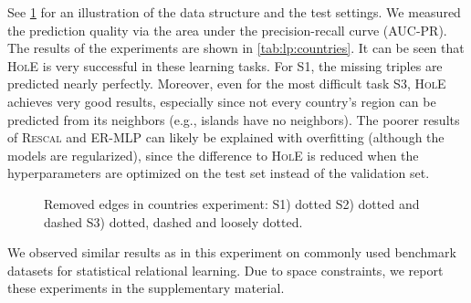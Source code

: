 \documentclass[letterpaper]{article}
\newcommand{\hole}{\textsc{HolE}\xspace}
\newcommand{\rescal}{\textsc{Rescal}\xspace}
\newcommand{\emlp}{\textsc{ER-MLP}\xspace}
\begin{document}
See \cref{fig:countries} for an illustration of the data structure and the test
settings. 
We measured the prediction quality via the area under the
precision-recall curve (AUC-PR).
The results of the experiments are shown in \cref{tab:lp:countries}. It
can be seen that \hole is very successful in these
learning tasks. For S1, the missing triples are predicted nearly
perfectly. Moreover, even for the most difficult task S3, \hole achieves very good
results, especially since not every country's region can be predicted from its
neighbors (e.g., islands have no neighbors). The poorer results of \rescal and
\emlp can likely be explained with overfitting (although the models are
regularized), since the difference to \hole is
reduced when the hyperparameters are optimized on the
test set instead of the validation set.
\begin{figure}[tb]
  \centering
  \vspace{-1ex}
  \hspace{1.5em}
  \caption{Removed edges in countries experiment: S1) dotted
    S2) dotted and dashed S3) dotted, dashed and loosely dotted.\label{fig:countries}}
\end{figure}
We observed similar results as in this experiment on commonly used benchmark datasets for
statistical relational learning. Due to space constraints, we report these
experiments in the supplementary material.
\end{document}
